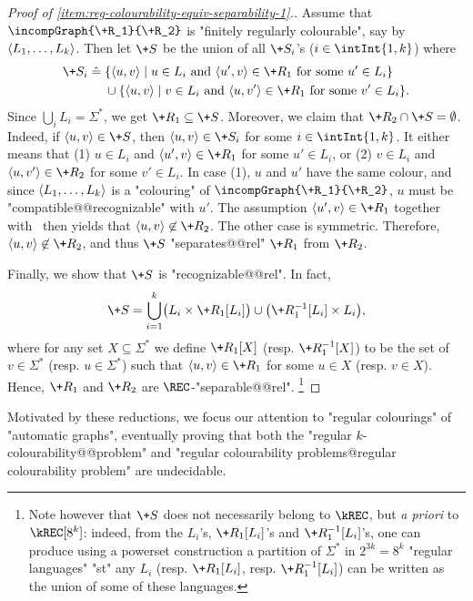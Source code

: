 \begin{proof}[Proof of \eqref{item:reg-colourability-equiv-separability-1}.]
    Assume that $\incompGraph{\+R_1}{\+R_2}$ is "finitely regularly colourable", say by
    $\langle L_1,\dotsc,L_k\rangle$. Then let $\+S$ be the union of all $\+S_i$'s ($i \in \intInt{1,k}$) where
    \begin{align*}
        \+S_i \defeq\; & \{\tup{u,v} \mid u \in L_i \text{ and } \tup{u',v} \in \+R_1 \text{ for some } u' \in L_i \}\\
        & \cup \{\tup{u,v} \mid v \in L_i \text{ and } \tup{u,v'} \in \+R_1 \text{ for some } v' \in L_i \}.  
    \end{align*}
    Since $\bigcup_i L_i = \Sigma^*$, we get $\+R_1 \subseteq \+S$.
    Moreover, we claim that $\+R_2 \cap \+S = \emptyset$. Indeed, if $\tup{u,v} \in \+S$,
    then $\tup{u,v} \in \+S_i$ for some $i \in \intInt{1,k}$. It either means that
    (1) $u\in L_i$ and $\tup{u',v} \in \+R_1$ for some $u' \in L_i$, or
    (2) $v\in L_i$ and $\tup{u,v'} \in \+R_2$
    for some $v' \in L_i$. In case (1), $u$ and $u'$
    have the same colour, and since $\langle L_1,\dotsc,L_k\rangle$ is a "colouring"
    of $\incompGraph{\+R_1}{\+R_2}$, $u$ must be "compatible@@recognizable" with $u'$.
    The assumption $\tup{u',v} \in \+R_1$ together with \compLpr\ then yields
    that $\tup{u,v} \not\in \+R_2$. The other case is symmetric.
    Therefore, $\tup{u,v} \not\in \+R_2$, and thus $\+S$ "separates@@rel" $\+R_1$ from $\+R_2$.

    Finally, we show that $\+S$ is "recognizable@@rel". In fact, 
    \[
        \+S = \bigcup_{i=1}^k \bigl(
            L_i \times \+R_1[L_i]
        \bigr) \cup \bigl(
            \+R_1^{-1}[L_i] \times L_i
        \bigr),
    \] 
    where for any set $X \subseteq \Sigma^*$ we define $\+R_1[X]$ (resp. $\+R_1^{-1}[X]$)
    to be the set of $v\in \Sigma^*$ (resp. $u \in \Sigma^*$) such that
    $\tup{u,v} \in \+R_1$ for some $u \in X$ (resp. $v\in X$).
    Hence, $\+R_1$ and $\+R_2$ are $\REC$-"separable@@rel".%
    \footnote{%
        Note however that $\+S$ does not necessarily belong to $\kREC$,
        but \emph{a priori} to $\kREC[8^k]$: indeed, from the
        $L_i$'s, $\+R_1[L_i]$'s and $\+R_1^{-1}[L_i]$'s,
        one can produce using a powerset construction a partition of $\Sigma^*$
        in $2^{3k} = 8^k$ "regular languages" "st" any $L_i$ (resp. $\+R_1[L_i]$,
        resp. $\+R_1^{-1}[L_i]$) can be written as the union of some of these languages.
    }
\end{proof}

Motivated by these reductions, we focus our attention to "regular colourings" of "automatic graphs",
eventually proving that both the "regular $k$-colourability@@problem" and
"regular colourability problems@regular colourability problem" are undecidable.
